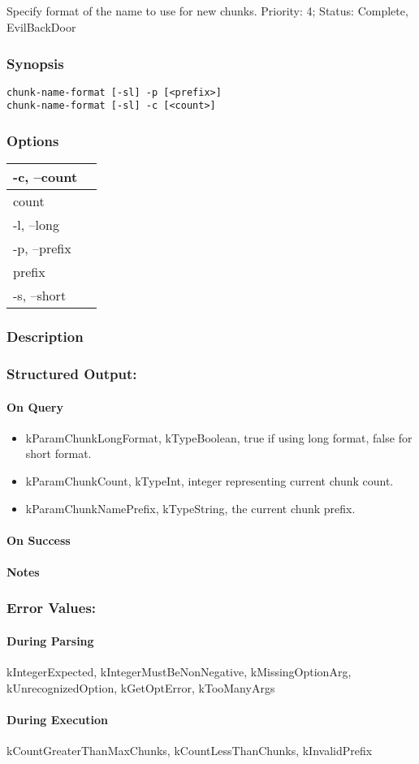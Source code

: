 \subsection{}
\label{chunk-name-format}
Specify format of the name to use for new chunks. 
 Priority: 4; Status: Complete, EvilBackDoor
\subsubsection*{Synopsis}
\begin{verbatim}
chunk-name-format [-sl] -p [<prefix>]
chunk-name-format [-sl] -c [<count>]
\end{verbatim}
\subsubsection*{Options}
\begin{tabular}{|l|l|}
\hline 
 -c, --count  & \\
 \hline 
 count  & \\
 \hline 
 -l, --long  & \\
 \hline 
 -p, --prefix  & \\
 \hline 
 prefix  & \\
 \hline 
 -s, --short  & \\
 \hline 
\end{tabular}
\subsubsection*{Description}
\subsubsection*{Structured Output:}
\paragraph*{On Query}
\begin{itemize}
\item  kParamChunkLongFormat, kTypeBoolean, true if using long format, false for short format. 
\item  kParamChunkCount, kTypeInt, integer representing current chunk count. 
\item  kParamChunkNamePrefix, kTypeString, the current chunk prefix. 
\end{itemize}
\paragraph*{On Success}
\paragraph*{Notes}
\subsubsection*{Error Values:}
\paragraph*{During Parsing}
 kIntegerExpected, kIntegerMustBeNonNegative, kMissingOptionArg, kUnrecognizedOption, kGetOptError, kTooManyArgs
\paragraph*{During Execution}
 kCountGreaterThanMaxChunks, kCountLessThanChunks, kInvalidPrefix
